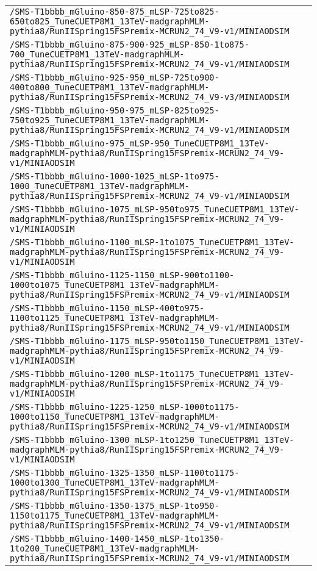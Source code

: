 \begin{center}
\begin{tabular}{l}
\verb!/SMS-T1bbbb_mGluino-850-875_mLSP-725to825-650to825_TuneCUETP8M1_13TeV-madgraphMLM-pythia8/RunIISpring15FSPremix-MCRUN2_74_V9-v1/MINIAODSIM! \tabularnewline
\verb!/SMS-T1bbbb_mGluino-875-900-925_mLSP-850-1to875-700_TuneCUETP8M1_13TeV-madgraphMLM-pythia8/RunIISpring15FSPremix-MCRUN2_74_V9-v1/MINIAODSIM! \tabularnewline
\verb!/SMS-T1bbbb_mGluino-925-950_mLSP-725to900-400to800_TuneCUETP8M1_13TeV-madgraphMLM-pythia8/RunIISpring15FSPremix-MCRUN2_74_V9-v3/MINIAODSIM! \tabularnewline
\verb!/SMS-T1bbbb_mGluino-950-975_mLSP-825to925-750to925_TuneCUETP8M1_13TeV-madgraphMLM-pythia8/RunIISpring15FSPremix-MCRUN2_74_V9-v1/MINIAODSIM! \tabularnewline
\verb!/SMS-T1bbbb_mGluino-975_mLSP-950_TuneCUETP8M1_13TeV-madgraphMLM-pythia8/RunIISpring15FSPremix-MCRUN2_74_V9-v1/MINIAODSIM! \tabularnewline
\verb!/SMS-T1bbbb_mGluino-1000-1025_mLSP-1to975-1000_TuneCUETP8M1_13TeV-madgraphMLM-pythia8/RunIISpring15FSPremix-MCRUN2_74_V9-v1/MINIAODSIM! \tabularnewline
\verb!/SMS-T1bbbb_mGluino-1075_mLSP-950to975_TuneCUETP8M1_13TeV-madgraphMLM-pythia8/RunIISpring15FSPremix-MCRUN2_74_V9-v1/MINIAODSIM! \tabularnewline
\verb!/SMS-T1bbbb_mGluino-1100_mLSP-1to1075_TuneCUETP8M1_13TeV-madgraphMLM-pythia8/RunIISpring15FSPremix-MCRUN2_74_V9-v1/MINIAODSIM! \tabularnewline
\verb!/SMS-T1bbbb_mGluino-1125-1150_mLSP-900to1100-1000to1075_TuneCUETP8M1_13TeV-madgraphMLM-pythia8/RunIISpring15FSPremix-MCRUN2_74_V9-v1/MINIAODSIM! \tabularnewline
\verb!/SMS-T1bbbb_mGluino-1150_mLSP-400to975-1100to1125_TuneCUETP8M1_13TeV-madgraphMLM-pythia8/RunIISpring15FSPremix-MCRUN2_74_V9-v1/MINIAODSIM! \tabularnewline
\verb!/SMS-T1bbbb_mGluino-1175_mLSP-950to1150_TuneCUETP8M1_13TeV-madgraphMLM-pythia8/RunIISpring15FSPremix-MCRUN2_74_V9-v1/MINIAODSIM! \tabularnewline
\verb!/SMS-T1bbbb_mGluino-1200_mLSP-1to1175_TuneCUETP8M1_13TeV-madgraphMLM-pythia8/RunIISpring15FSPremix-MCRUN2_74_V9-v1/MINIAODSIM! \tabularnewline
\verb!/SMS-T1bbbb_mGluino-1225-1250_mLSP-1000to1175-1000to1150_TuneCUETP8M1_13TeV-madgraphMLM-pythia8/RunIISpring15FSPremix-MCRUN2_74_V9-v1/MINIAODSIM! \tabularnewline
\verb!/SMS-T1bbbb_mGluino-1300_mLSP-1to1250_TuneCUETP8M1_13TeV-madgraphMLM-pythia8/RunIISpring15FSPremix-MCRUN2_74_V9-v1/MINIAODSIM! \tabularnewline
\verb!/SMS-T1bbbb_mGluino-1325-1350_mLSP-1100to1175-1000to1300_TuneCUETP8M1_13TeV-madgraphMLM-pythia8/RunIISpring15FSPremix-MCRUN2_74_V9-v1/MINIAODSIM! \tabularnewline
\verb!/SMS-T1bbbb_mGluino-1350-1375_mLSP-1to950-1150to1175_TuneCUETP8M1_13TeV-madgraphMLM-pythia8/RunIISpring15FSPremix-MCRUN2_74_V9-v1/MINIAODSIM! \tabularnewline
\verb!/SMS-T1bbbb_mGluino-1400-1450_mLSP-1to1350-1to200_TuneCUETP8M1_13TeV-madgraphMLM-pythia8/RunIISpring15FSPremix-MCRUN2_74_V9-v1/MINIAODSIM! \tabularnewline

\end{tabular}
\end{center}
